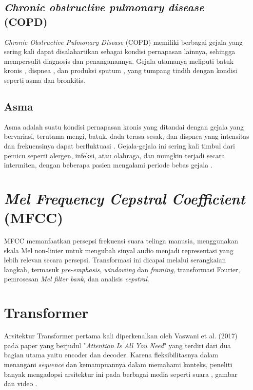 \subsection{\textit{Chronic obstructive pulmonary disease} (COPD)}
\label{subsection:copd}
\textit{Chronic Obstructive Pulmonary Disease} (COPD) memiliki berbagai gejala yang sering kali dapat disalahartikan sebagai kondisi pernapasan lainnya, sehingga mempersulit diagnosis dan penanganannya. Gejala utamanya meliputi batuk kronis \cite{PMID:31710455}, dispnea \cite{singh2017chronic}, dan produksi sputum \cite{mannino2001chronic}, yang tumpang tindih dengan kondisi seperti asma dan bronkitis.
\subsection{Asma}
\label{subsection:asma}
Asma adalah suatu kondisi pernapasan kronis yang ditandai dengan gejala yang bervariasi, terutama mengi, batuk, dada terasa sesak, dan dispnea yang intensitas dan frekuensinya dapat berfluktuasi \cite{PMID:35143150}. Gejala-gejala ini sering kali timbul dari pemicu seperti alergen, infeksi, atau olahraga, dan mungkin terjadi secara intermiten, dengan beberapa pasien mengalami periode bebas gejala \cite{PMID:35143150,MALARVILI202325}.
\section{\textit{Mel Frequency Cepstral Coefficient} (MFCC)}
MFCC memanfaatkan persepsi frekuensi suara telinga manusia, menggunakan skala Mel non-linier untuk mengubah sinyal audio menjadi representasi yang lebih relevan secara persepsi. Transformasi ini dicapai melalui serangkaian langkah, termasuk \textit{pre-emphasis}, \textit{windowing} dan \textit{framing}, transformasi Fourier, pemrosesan \textit{Mel filter bank}, dan analisis \textit{cepstral}\cite{al2023mel,Sueur2018}.

\section{Transformer}
Arsitektur Transformer pertama kali diperkenalkan oleh Vaswani et al. (2017) pada paper yang berjudul "\textit{Attention Is All You Need}"\cite{vaswani2023attentionneed} yang terdiri dari dua bagian utama yaitu encoder dan decoder. Karena fleksibilitasnya dalam menangani \textit{sequence} dan kemampuannya dalam memahami konteks, peneliti banyak mengadopsi arsitektur ini pada berbagai media seperti suara \cite{xiao2024lungadapter}, gambar \cite{dosovitskiy2021imageworth16x16words} dan video \cite{arnab2021vivitvideovisiontransformer}.

